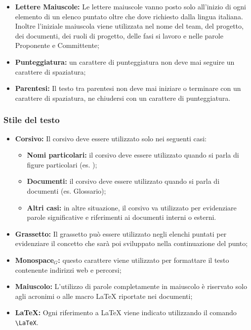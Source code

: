 \begin{itemize}
\item \textbf{Lettere Maiuscole:} Le lettere maiuscole vanno posto solo  all'inizio di ogni elemento di un elenco puntato oltre che dove richiesto dalla lingua italiana. Inoltre l'iniziale maiuscola viene utilizzata nel nome del team, del progetto, dei documenti, dei ruoli di progetto, delle fasi si lavoro e nelle parole Proponente e Committente;
\item \textbf{Punteggiatura:} un carattere di punteggiatura non deve mai seguire un carattere di spaziatura;
\item \textbf{Parentesi:} Il testo tra parentesi non deve mai iniziare o terminare con un carattere di spaziatura, ne chiudersi con un carattere di punteggiatura.
\end{itemize}

\subsubsection{Stile del testo}

\begin{itemize}
\item \textbf{Corsivo:} Il corsivo deve essere utilizzato solo nei seguenti casi:
\begin{itemize}
\item \textbf{Nomi particolari:} il corsivo deve essere utilizzato quando si parla di figure particolari (es. \ruoloResponsabile);
\item \textbf{Documenti:} il corsivo deve essere utilizzato quando si parla di documenti (es. Glossario);
\item \textbf{Altri casi:} in altre situazione, il corsivo va utilizzato per evidenziare parole significative e riferimenti ai documenti interni o esterni.
\end{itemize} 
\item \textbf{Grassetto:} Il grassetto può essere utilizzato negli elenchi puntati per evidenziare il concetto che sarà poi sviluppato nella continuazione del punto;
\item \textbf{Monospace$_{G}$:} questo carattere viene utilizzato per formattare il testo contenente indirizzi web e percorsi;
\item \textbf{Maiuscolo:} L'utilizzo di parole completamente in maiuscolo è riservato solo agli acronimi o alle macro \LaTeX{} riportate nei documenti;
\item \textbf{\LaTeX:} Ogni riferimento a \LaTeX{} viene indicato utilizzando il comando \verb|\LaTeX|.
\end{itemize}

